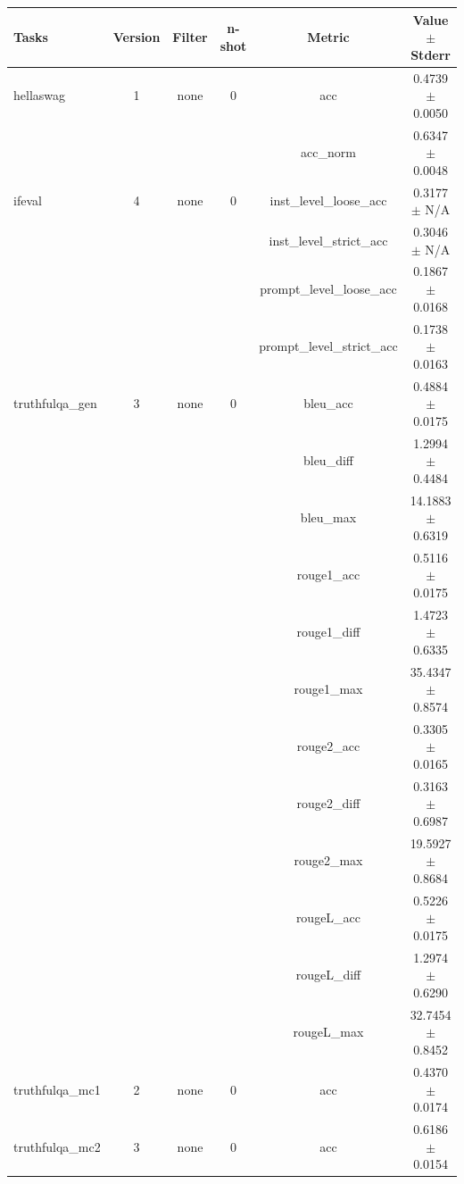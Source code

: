 \documentclass{ifacconf}
\begin{document}
	\vfill
	\clearpage
	\pagebreak
	
	\begin{strip}
		\begin{minipage}{\textwidth}
			\begin{table}[H]
				\centering
				\begin{tabular}{|l|c|c|c|c|c|}
					\hline
					\textbf{Tasks} & \textbf{Version} & \textbf{Filter} & \textbf{n-shot} & \textbf{Metric} & \textbf{Value} $\pm$ \textbf{Stderr} \\ \hline
					hellaswag & 1 & none & 0 & acc & 0.4739 $\pm$ 0.0050 \\ \hline
					& & & & acc\_norm & 0.6347 $\pm$ 0.0048 \\ \hline
					ifeval & 4 & none & 0 & inst\_level\_loose\_acc & 0.3177 $\pm$ N/A \\ \hline
					& & & & inst\_level\_strict\_acc & 0.3046 $\pm$ N/A \\ \hline
					& & & & prompt\_level\_loose\_acc & 0.1867 $\pm$ 0.0168 \\ \hline
					& & & & prompt\_level\_strict\_acc & 0.1738 $\pm$ 0.0163 \\ \hline
					truthfulqa\_gen & 3 & none & 0 & bleu\_acc & 0.4884 $\pm$ 0.0175 \\ \hline
					& & & & bleu\_diff & 1.2994 $\pm$ 0.4484 \\ \hline
					& & & & bleu\_max & 14.1883 $\pm$ 0.6319 \\ \hline
					& & & & rouge1\_acc & 0.5116 $\pm$ 0.0175 \\ \hline
					& & & & rouge1\_diff & 1.4723 $\pm$ 0.6335 \\ \hline
					& & & & rouge1\_max & 35.4347 $\pm$ 0.8574 \\ \hline
					& & & & rouge2\_acc & 0.3305 $\pm$ 0.0165 \\ \hline
					& & & & rouge2\_diff & 0.3163 $\pm$ 0.6987 \\ \hline
					& & & & rouge2\_max & 19.5927 $\pm$ 0.8684 \\ \hline
					& & & & rougeL\_acc & 0.5226 $\pm$ 0.0175 \\ \hline
					& & & & rougeL\_diff & 1.2974 $\pm$ 0.6290 \\ \hline
					& & & & rougeL\_max & 32.7454 $\pm$ 0.8452 \\ \hline
					truthfulqa\_mc1 & 2 & none & 0 & acc & 0.4370 $\pm$ 0.0174 \\ \hline
					truthfulqa\_mc2 & 3 & none & 0 & acc & 0.6186 $\pm$ 0.0154 \\ \hline
				\end{tabular}
				\label{tab:gemma2_awq}
			\end{table}
			

\end{minipage}
\end{strip}
\end{document}
